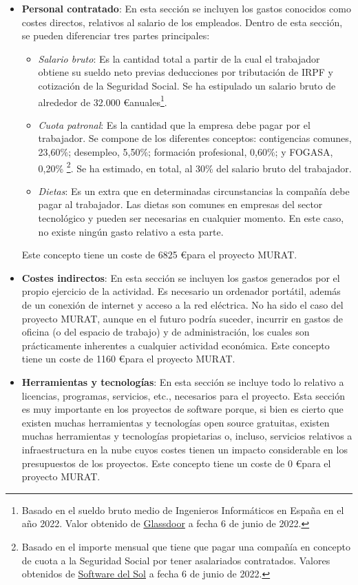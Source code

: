 \begin{itemize}
    \item \textbf{Personal contratado}: En esta sección se incluyen los gastos conocidos como costes directos, relativos al salario de los empleados. Dentro de esta sección, se pueden diferenciar tres partes principales:
    \begin{itemize}
        \item \textit{Salario bruto}: Es la cantidad total a partir de la cual el trabajador obtiene su sueldo neto previas deducciones por tributación de IRPF y cotización de la Seguridad Social. Se ha estipulado un salario bruto de alrededor de 32.000 \euro \space anuales\footnote{Basado en el sueldo bruto medio de Ingenieros Informáticos en España en el año 2022. Valor obtenido de \href{https://www.glassdoor.es/Sueldos/ingeniero-inform\%C3\%A1tico-sueldo-SRCH_KO0,21.htm}{Glassdoor} a fecha 6 de junio de 2022.}. \newpage
        \item \textit{Cuota patronal}: Es la cantidad que la empresa debe pagar por el trabajador. Se compone de los diferentes conceptos: contigencias comunes, 23,60\%; desempleo, 5,50\%; formación profesional, 0,60\%; y FOGASA, 0,20\% \footnote{Basado en el importe mensual que tiene que pagar una compañía en concepto de cuota a la Seguridad Social por tener asalariados contratados. Valores obtenidos de \href{https://www.sdelsol.com/glosario/cuota-patronal/}{Software del Sol} a fecha 6 de junio de 2022.}. Se ha estimado, en total, al 30\% del salario bruto del trabajador.
        \item \textit{Dietas}: Es un extra que en determinadas circunstancias la compañía debe pagar al trabajador. Las dietas son comunes en empresas del sector tecnológico y pueden ser necesarias en cualquier momento. En este caso, no existe ningún gasto relativo a esta parte.
    \end{itemize}
    Este concepto tiene un coste de 6825 \euro \space para el proyecto MURAT.
    \item \textbf{Costes indirectos}: En esta sección se incluyen los gastos generados por el propio ejercicio de la actividad. Es necesario un ordenador portátil, además de un conexión de internet y acceso a la red eléctrica. No  ha sido el caso del proyecto MURAT, aunque en el futuro podría suceder, incurrir en gastos de oficina (o del espacio de trabajo) y de administración, los cuales son prácticamente inherentes a cualquier actividad económica. Este concepto tiene un coste de 1160 \euro \space para el proyecto MURAT.
    \item \textbf{Herramientas y tecnologías}: En esta sección se incluye todo lo relativo a licencias, programas, servicios, etc., necesarios para el proyecto. Esta sección es muy importante en los proyectos de software porque, si bien es cierto que existen muchas herramientas y tecnologías open source gratuitas, existen muchas herramientas y tecnologías propietarias o, incluso, servicios relativos a infraestructura en la nube cuyos costes tienen un impacto considerable en los presupuestos de los proyectos. Este concepto tiene un coste de 0 \euro \space para el proyecto MURAT.
\end{itemize}

